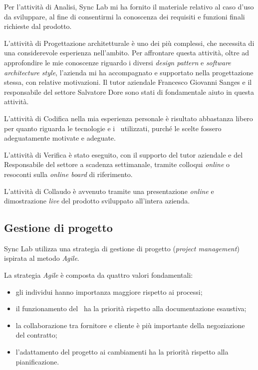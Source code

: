 Per l'attività di Analisi, Sync Lab mi ha fornito il materiale relativo al caso d'uso da sviluppare, al fine di consentirmi la conoscenza dei requisiti e funzioni finali richieste dal prodotto.

L'attività di Progettazione architetturale è uno dei più complessi, che necessita di una considerevole esperienza nell'ambito.
Per affrontare questa attività, oltre ad approfondire le mie conoscenze riguardo i diversi \textit{design pattern} e \textit{software architecture style}, l'azienda mi ha accompagnato e supportato nella progettazione stessa, con relative motivazioni.
Il tutor aziendale  Francesco Giovanni Sanges e il responsabile del settore  Salvatore Dore
sono stati di fondamentale aiuto in questa attività.

L'attività di Codifica nella mia esperienza personale è risultato abbastanza libero per quanto riguarda le tecnologie e i \software\ utilizzati, purché le scelte fossero adeguatamente motivate e adeguate.

L'attività di Verifica è stato eseguito, con il supporto del tutor aziendale e del Responsabile del settore  a scadenza settimanale, tramite colloqui \textit{online} o resoconti sulla \textit{online board} di riferimento.

L'attività di Collaudo è avvenuto tramite una presentazione \textit{online} e dimostrazione \textit{live} del prodotto sviluppato all'intera azienda.

\subsection{Gestione di progetto}


Sync Lab utilizza una strategia di gestione di progetto (\textit{project management}) ispirata al metodo \textit{Agile}.

\noindent
La strategia \textit{Agile} è composta da quattro valori fondamentali:
\begin{itemize}
  \item gli individui hanno importanza maggiore rispetto ai processi;
  \item il funzionamento del \software\ ha la priorità rispetto alla documentazione esaustiva;
  \item la collaborazione tra fornitore e cliente è più importante della negoziazione del contratto;
  \item l'adattamento del progetto ai cambiamenti ha la priorità rispetto alla pianificazione.
\end{itemize}

